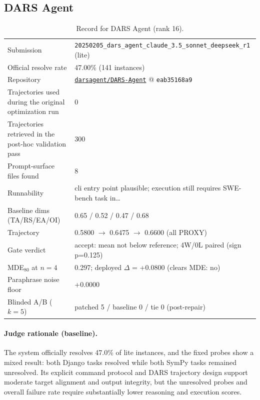 \subsection{DARS Agent}
\label{app:agent16}
\begin{table}[h]\centering\scriptsize
\caption{Record for DARS Agent (rank 16).}
\begin{tabular}{lp{8.2cm}}\toprule
Submission & \texttt{20250205\_\allowbreak{}dars\_\allowbreak{}agent\_\allowbreak{}claude\_\allowbreak{}3.5\_\allowbreak{}sonnet\_\allowbreak{}deepseek\_\allowbreak{}r1} (lite) \\
Official resolve rate & 47.00\% (141 instances) \\
Repository & \href{https://github.com/darsagent/DARS-Agent}{\texttt{darsagent/DARS-Agent}} @ \texttt{eab35168a9} \\
Trajectories used during the original optimization run & 0 \\
Trajectories retrieved in the post-hoc validation pass & 300 \\
Prompt-surface files found & 8 \\
Runnability & cli entry point plausible; execution still requires SWE-bench task in\ldots{} \\
Baseline dims (TA/RS/EA/OI) & 0.65 / 0.52 / 0.47 / 0.68 \\
Trajectory & 0.5800 $\to$ 0.6475 $\to$ 0.6600 (all PROXY) \\
Gate verdict & accept: mean not below reference; 4W/0L paired (sign p=0.125) \\
MDE$_{80}$ at $n{=}4$ & 0.297; deployed $\Delta$ = +0.0800 (clears MDE: no) \\
Paraphrase noise floor & +0.0000 \\
Blinded A/B ($k{=}5$) & patched 5 / baseline 0 / tie 0 (post-repair) \\
\bottomrule\end{tabular}\end{table}
\paragraph{Judge rationale (baseline).}
The system officially resolves 47.0\% of lite instances, and the fixed probes show a mixed result: both Django tasks resolved while both SymPy tasks remained unresolved. Its explicit command protocol and DARS trajectory design support moderate target alignment and output integrity, but the unresolved probes and overall failure rate require substantially lower reasoning and execution scores.
